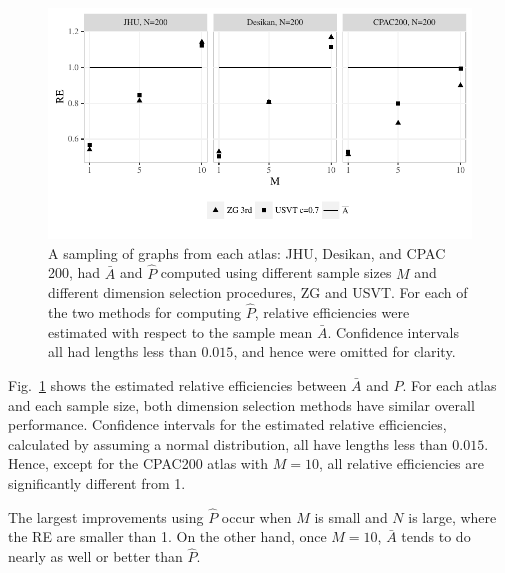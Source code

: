 \documentclass[journal,twoside,web]{ieeecolor}
\begin{document}
\begin{figure}
\begin{center}
  \includegraphics[width=1\linewidth]{corr_data_REdiff.pdf}
\end{center}
\caption{
A sampling of graphs from each atlas: JHU, Desikan, and CPAC 200, had $\bar{A}$ and $\hat{P}$ computed using different sample sizes $M$ and different dimension selection procedures, ZG and USVT.
For each of the two methods for computing $\hat{P}$, relative efficiencies were estimated with respect to the sample mean $\bar{A}$.
Confidence intervals all had lengths less than $0.015$, and hence were omitted for clarity.
}
\label{fig:corr_re}
\end{figure}

Fig.~\ref{fig:corr_re} shows the estimated relative efficiencies between $\bar{A}$ and $\hat{P}$.
For each atlas and each sample size, both dimension selection methods have similar overall performance.
Confidence intervals for the estimated relative efficiencies, calculated by assuming a normal distribution, all have lengths less than $0.015$.
Hence, except for the CPAC200 atlas with $M=10$, all relative efficiencies are significantly different from 1.

The largest improvements using $\hat{P}$ occur when $M$ is small and $N$ is large, where the RE are smaller than 1.
On the other hand, once $M=10$, $\bar{A}$ tends to do nearly as well or better than $\hat{P}$.
\end{document}
